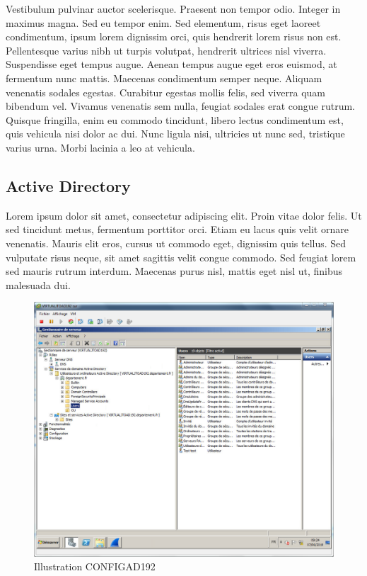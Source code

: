 \documentclass{report}
\begin{document}
Vestibulum pulvinar auctor scelerisque. Praesent non tempor odio. Integer in maximus magna. Sed eu tempor enim. Sed elementum, risus eget laoreet condimentum, ipsum lorem dignissim orci, quis hendrerit lorem risus non est. Pellentesque varius nibh ut turpis volutpat, hendrerit ultrices nisl viverra. Suspendisse eget tempus augue. Aenean tempus augue eget eros euismod, at fermentum nunc mattis. Maecenas condimentum semper neque. Aliquam venenatis sodales egestas. Curabitur egestas mollis felis, sed viverra quam bibendum vel. Vivamus venenatis sem nulla, feugiat sodales erat congue rutrum. Quisque fringilla, enim eu commodo tincidunt, libero lectus condimentum est, quis vehicula nisi dolor ac dui. Nunc ligula nisi, ultricies ut nunc sed, tristique varius urna. Morbi lacinia a leo at vehicula.

\subsection{Active Directory}

Lorem ipsum dolor sit amet, consectetur adipiscing elit. Proin vitae dolor felis. Ut sed tincidunt metus, fermentum porttitor orci. Etiam eu lacus quis velit ornare venenatis. Mauris elit eros, cursus ut commodo eget, dignissim quis tellus. Sed vulputate risus neque, sit amet sagittis velit congue commodo. Sed feugiat lorem sed mauris rutrum interdum. Maecenas purus nisl, mattis eget nisl ut, finibus malesuada dui.


\begin{figure}[!h]
\centering
\includegraphics[width=17cm]{./images/images/CONFIGAD192}
\caption{Illustration CONFIGAD192}
\end{figure}
\end{document}
